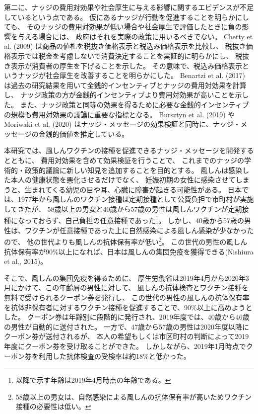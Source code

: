 \documentclass[
  11pt,
  a4paper,
]{article}
\begin{document}
第二に、ナッジの費用対効果や社会厚生に与える影響に関するエビデンスが不足しているという点である。
仮にあるナッジが行動を促進することを明らかにしても、
そのナッジの費用対効果が低い場合や社会厚生で評価したときに負の影響を与える場合には、
政府はそれを実際の政策に用いるべきでない。
Chetty et al. (2009) は商品の値札を税抜き価格表示と税込み価格表示を比較し、
税抜き価格表示では税金を考慮しないで消費決定することを実証的に明らかにし、
税抜き表示が消費者の厚生を下げることを示した。
その意味で、税込み価格表示というナッジが社会厚生を改善することを明らかにした。
Benartzi et al. (2017) は過去の研究結果を用いて金銭的インセンティブとナッジの費用対効果を計算し、
ナッジ政策の方が金銭的インセンティブより費用対効果が高いことを示した。
また、ナッジ政策と同等の効果を得るために必要な金銭的インセンティブの規模も費用対効果の議論に重要な指標となる。
Bursztyn et al. (2019) や Moriwaki et al. (2020) はナッジ・メッセージの効果検証と同時に、ナッジ・メッセージの金銭的価値を推定している。

本研究では、風しんワクチンの接種を促進できるナッジ・メッセージを開発するとともに、
費用対効果を含めて効果検証を行うことで、
これまでのナッジの学術的・政策的議論に新しい知見を追加することを目的とする。
風しんは感染した本人の健康状態を悪化させるだけでなく、
妊娠初期の女性に感染させてしまうと、生まれてくる幼児の目や耳、心臓に障害が起きる可能性がある。
日本では、1977年から風しんのワクチン接種は定期接種として公費負担で市町村が実施してきたが、
58歳以上の男女と40歳から57歳の男性は風しんワクチンが定期接種になっておらず、自己負担の任意接種であった\footnote{以降で示す年齢は2019年4月時点の年齢である。}。
しかし、40歳から57歳の男性は、ワクチンが任意接種であった上に自然感染による風しん感染が少なかったので、
他の世代よりも風しんの抗体保有率が低い\footnote{58歳以上の男女は、自然感染による風しんの抗体保有率が高いためワクチン接種の必要性は低い。}。
この世代の男性の風しん抗体保有率が90\%以上になれば、日本は風しんの集団免疫を獲得できる(Nishiura et al., 2015)。

そこで、風しんの集団免疫を得るために、
厚生労働省は2019年4月から2020年3月にかけて、この年齢層の男性に対して、
風しんの抗体検査とワクチン接種を無料で受けられるクーポン券を発行し、
この世代の男性の風しんの抗体保有率を抗体非保有者に対するワクチン接種を促進することで、90\%以上に高めようとした。
クーポン券は年齢別に段階的に発行され、2019年度では、40歳から46歳の男性が自動的に送付された。
一方で、47歳から57歳の男性は2020年度以降にクーポン券が送付されるが、
本人の希望もしくは市区町村の判断によって2019年度にクーポン券を受け取ることができた。
しかしながら、2019年1月時点でクーポン券を利用した抗体検査の受検率は約18\%と低かった。
\end{document}

